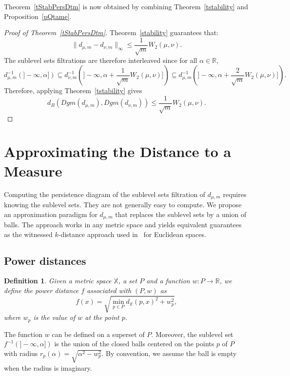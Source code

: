 \documentclass[a4paper]{article}
\newcommand\norm[1]{\|#1\|}
\newcommand\dm{d_{\mu,m}}
\newcommand\X{\mathbb{X}}
\newcommand\R{\mathbb{R}}
\newcommand\dX[2]{d_\X(#1,#2)}
\newtheorem{definition}[theorem]{Definition}
\begin{document}
Theorem~\ref{tStabPersDtm} is now obtained by combining Theorem~\ref{tstability} and Proposition~\ref{pQtame}.

\begin{proof}[Proof of Theorem~\ref{tStabPersDtm}]
Theorem~\ref{stability} guarantees that:
$$\norm{\dm-d_{\nu,m}}_\infty\leq\frac{1}{\sqrt{m}}W_2(\mu,\nu).$$
The sublevel sets filtrations are therefore interleaved since for all $\alpha\in\R$,
\[
  \dm^{-1}(]-\infty,\alpha])
    \subseteq 
  d_{\nu,m}^{-1}(]-\infty,\alpha+\frac{1}{\sqrt{m}}W_2(\mu,\nu)])
    \subseteq
  \dm^{-1}(]-\infty,\alpha+\frac{2}{\sqrt{m}}W_2(\mu,\nu)]).
\]
Therefore, applying Theorem~\ref{tstability} gives
\[
  d_B(Dgm(\dm),Dgm(d_{\nu,m}))\leq\frac{1}{\sqrt{m}}W_2(\mu,\nu).
\]
\end{proof}



\section{Approximating the Distance to a Measure} \label{sec:approximating_the_distance_to_a_measure}

Computing the persistence diagram of the sublevel sets filtration of $\dm$ requires knowing the sublevel sets. 
They are not generally easy to compute. 
We propose an approximation paradigm for $\dm$ that replaces the sublevel sets by a union of balls.
The approach works in any metric space and yields equivalent guarantees as the witnessed $k$-distance approach used in~\cite{wkdGMM} for Euclidean spaces.

\subsection{Power distances}\label{sApd}



\begin{definition}
  Given a metric space $\X$, a set $P$ and a function $w:P\to\R$, we define the \emph{power distance} $f$ associated with $(P,w)$ as
  \begin{equation}\label{eq:power_distance}
    f(x)=\sqrt{\min_{p\in P}\dX{p}{x}^2+w_p^2},
  \end{equation}
  where $w_p$ is the value of $w$ at the point $p$.
\end{definition}

The function $w$ can be defined on a superset of $P$.
Moreover, the sublevel set $f^{-1}(]-\infty,\alpha])$ is the union of the closed balls centered on the points $p$ of $P$ with radius $r_p(\alpha)=\sqrt{\alpha^2-w_p^2}$.
By convention, we assume the ball is empty when the radius is imaginary.
\end{document}
